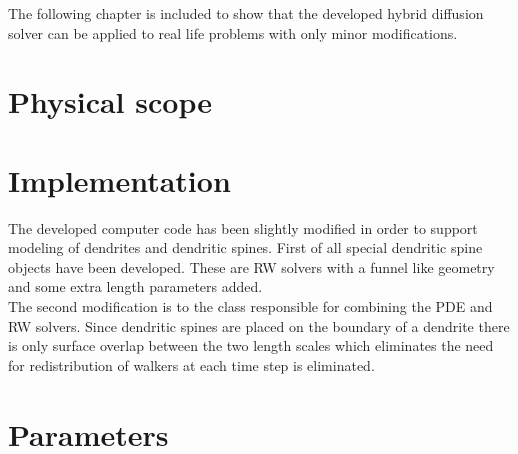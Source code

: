 The following chapter is included to show that the developed hybrid diffusion solver can be applied to real life problems with only minor modifications.

\section{Physical scope}



\section{Implementation}

The developed computer code has been slightly modified in order to support modeling of dendrites and dendritic spines. 
First of all special dendritic spine objects have been developed. 
These are RW solvers with a funnel like geometry and some extra length parameters added. \\
The second modification is to the class responsible for combining the PDE and RW solvers. 
Since dendritic spines are placed on the boundary of a dendrite there is only surface overlap between the two length scales which eliminates the need for redistribution of walkers at each time step is eliminated.

\section{Parameters}

